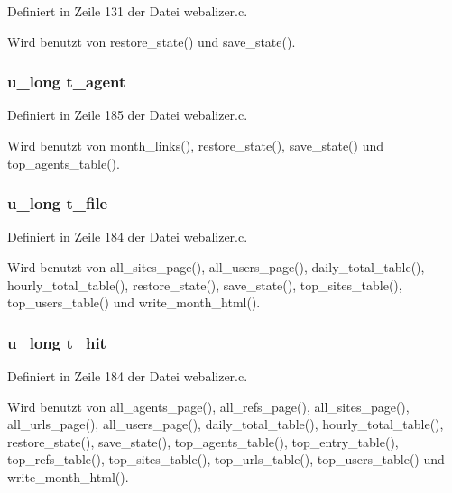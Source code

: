 Definiert in Zeile 131 der Datei webalizer.c.

Wird benutzt von restore\_\-state() und save\_\-state().
\subsubsection{\setlength{\rightskip}{0pt plus 5cm}u\_\-long {\bf t\_\-agent}}\label{webalizer_8h_681645a12ff433a6d191ac4eabbb265d}




Definiert in Zeile 185 der Datei webalizer.c.

Wird benutzt von month\_\-links(), restore\_\-state(), save\_\-state() und top\_\-agents\_\-table().
\subsubsection{\setlength{\rightskip}{0pt plus 5cm}u\_\-long {\bf t\_\-file}}\label{webalizer_8h_8d8f1b3ebaff4207130ee4e068a74578}




Definiert in Zeile 184 der Datei webalizer.c.

Wird benutzt von all\_\-sites\_\-page(), all\_\-users\_\-page(), daily\_\-total\_\-table(), hourly\_\-total\_\-table(), restore\_\-state(), save\_\-state(), top\_\-sites\_\-table(), top\_\-users\_\-table() und write\_\-month\_\-html().
\subsubsection{\setlength{\rightskip}{0pt plus 5cm}u\_\-long {\bf t\_\-hit}}\label{webalizer_8h_4f0e430951167c36ff37f1373c453d40}




Definiert in Zeile 184 der Datei webalizer.c.

Wird benutzt von all\_\-agents\_\-page(), all\_\-refs\_\-page(), all\_\-sites\_\-page(), all\_\-urls\_\-page(), all\_\-users\_\-page(), daily\_\-total\_\-table(), hourly\_\-total\_\-table(), restore\_\-state(), save\_\-state(), top\_\-agents\_\-table(), top\_\-entry\_\-table(), top\_\-refs\_\-table(), top\_\-sites\_\-table(), top\_\-urls\_\-table(), top\_\-users\_\-table() und write\_\-month\_\-html().
